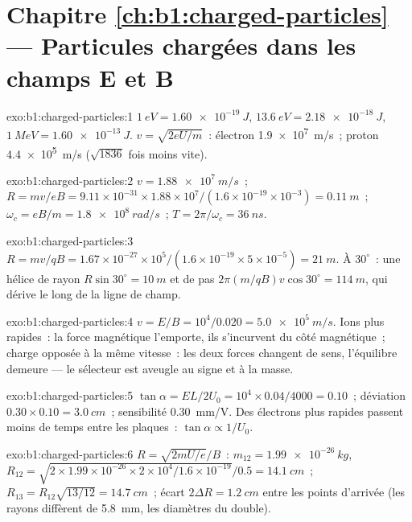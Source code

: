 \section*{Chapitre \ref{ch:b1:charged-particles} --- Particules chargées dans les champs E et B}

\begin{solution}{exo:b1:charged-particles:1}
$\qty{1}{eV} = \qty{1.60e-19}{J}$, $\qty{13.6}{eV} = \qty{2.18e-18}{J}$,
$\qty{1}{MeV} = \qty{1.60e-13}{J}$. $v = \sqrt{2eU/m}$~: électron
\qty{1.9e7}{m/s}~; proton \qty{4.4e5}{m/s} ($\sqrt{1836}$ fois moins vite).
\end{solution}

\begin{solution}{exo:b1:charged-particles:2}
$v = \qty{1.88e7}{m/s}$~; $R = mv/eB = 9.11\times10^{-31} \times 1.88\times10^7/
(1.6\times10^{-19} \times 10^{-3}) = \qty{0.11}{m}$~; $\omega_c = eB/m =
\qty{1.8e8}{rad/s}$~; $T = 2\pi/\omega_c = \qty{36}{ns}$.
\end{solution}

\begin{solution}{exo:b1:charged-particles:3}
$R = mv/qB = 1.67\times10^{-27} \times 10^5/(1.6\times10^{-19} \times 5\times
10^{-5}) = \qty{21}{m}$. À $30^\circ$~: une hélice de rayon $R\sin 30^\circ
= \qty{10}{m}$ et de pas $2\pi(m/qB)v\cos 30^\circ = \qty{114}{m}$, qui
dérive le long de la ligne de champ.
\end{solution}

\begin{solution}{exo:b1:charged-particles:4}
$v = E/B = 10^4/0.020 = \qty{5.0e5}{m/s}$. Ions plus rapides~: la force
magnétique l'emporte, ils s'incurvent du côté magnétique~; charge opposée
à la même vitesse~: les deux forces changent de sens, l'équilibre
demeure --- le sélecteur est aveugle au signe et à la masse.
\end{solution}

\begin{solution}{exo:b1:charged-particles:5}
$\tan\alpha = EL/2U_0 = 10^4 \times 0.04/4000 = 0.10$~; déviation
$0.30 \times 0.10 = \qty{3.0}{cm}$~; sensibilité \qty{0.30}{mm/V}. Des
électrons plus rapides passent moins de temps entre les plaques~:
$\tan\alpha \propto 1/U_0$.
\end{solution}

\begin{solution}{exo:b1:charged-particles:6}
$R = \sqrt{2mU/e}/B$~: $m_{12} = \qty{1.99e-26}{kg}$, $R_{12} = \sqrt{2 \times
1.99\times10^{-26} \times 2\times10^4/1.6\times10^{-19}}/0.5 = \qty{14.1}{cm}$~;
$R_{13} = R_{12}\sqrt{13/12} = \qty{14.7}{cm}$~; écart $2\Delta R =
\qty{1.2}{cm}$ entre les points d'arrivée (les rayons diffèrent de
\qty{5.8}{mm}, les diamètres du double).
\end{solution}

